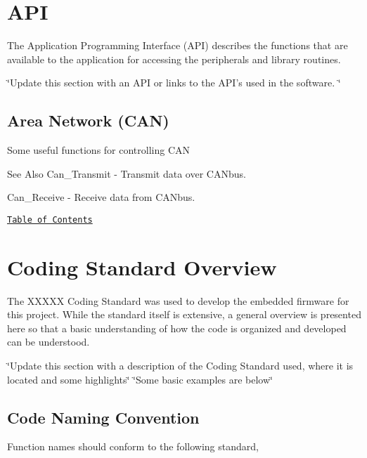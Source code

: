\label{_API}%
\hypertarget{index_API}{}\section{A\-P\-I}\label{index_API}
The Application Programming Interface (A\-P\-I) describes the functions that are available to the application for accessing the peripherals and library routines.

\char`\"{}\-Update this section with an A\-P\-I or links to the A\-P\-I's used in the software.  \char`\"{}\hypertarget{index_Controller}{}\subsection{Area Network (\-C\-A\-N)}\label{index_Controller}
Some useful functions for controlling C\-A\-N \begin{DoxySeeAlso}{See Also}
Can\-\_\-\-Transmit -\/ Transmit data over C\-A\-Nbus. \par
 

Can\-\_\-\-Receive -\/ Receive data from C\-A\-Nbus. \par

\end{DoxySeeAlso}
\par
\href{#Contents}{\tt Table of Contents}\par
 



\label{_CodingStandard}%
\hypertarget{index_Standard}{}\section{Coding Standard Overview}\label{index_Standard}
The X\-X\-X\-X\-X Coding Standard was used to develop the embedded firmware for this project. While the standard itself is extensive, a general overview is presented here so that a basic understanding of how the code is organized and developed can be understood. \par
\par


\char`\"{}\-Update this section with a description of the Coding Standard used, where it is located and some highlights\char`\"{} \char`\"{}\-Some basic examples are below\char`\"{}\hypertarget{index_CNC}{}\subsection{Code Naming Convention}\label{index_CNC}
Function names should conform to the following standard, \par

